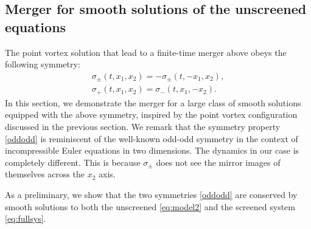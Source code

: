 \documentclass[11pt,reqno]{amsproc}
\begin{document}
\subsection{Merger for smooth solutions of the unscreened equations}
The point vortex solution that lead to a finite-time merger above obeys the following symmetry:
\begin{equation}\label{oddodd}
\begin{aligned}
    \sigma_\pm (t,x_1,x_2) = -\sigma_{\pm}(t,-x_1,x_2),\\
    \sigma_+(t,x_1,x_2) = \sigma_-(t,x_1,-x_2).
\end{aligned}
\end{equation}
In this section, we demonstrate the merger for a large class of smooth solutions equipped with the above symmetry, inspired by the point vortex configuration discussed in the previous section. We remark that the symmetry property \eqref{oddodd} is reminiscent of the well-known odd-odd symmetry in the context of incompressible Euler equations in two dimensions. The dynamics in our case is completely different. This is because $\sigma_\pm$ does not see the mirror images of themselves across the $x_2$ axis.

As a preliminary, we show that the two symmetries \eqref{oddodd} are conserved by smooth solutions to both the unscreened  \eqref{eq:model2} and the screened system \eqref{eq:fullsys}.
\end{document}
